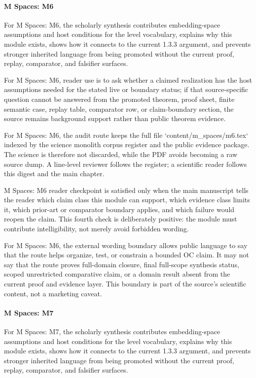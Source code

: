 \paragraph{M Spaces: M6}

For M Spaces: M6, the scholarly synthesis contributes embedding-space assumptions and host conditions for the level vocabulary, explains why this module exists, shows how it connects to the current 1.3.3 argument, and prevents stronger inherited language from being promoted without the current proof, replay, comparator, and falsifier surfaces.


For M Spaces: M6, reader use is to ask whether a claimed realization has the host assumptions needed for the stated live or boundary status; if that source-specific question cannot be answered from the promoted theorem, proof sheet, finite semantic case, replay table, comparator row, or claim-boundary section, the source remains background support rather than public theorem evidence.


For M Spaces: M6, the audit route keeps the full file `content/m\_spaces/m6.tex` indexed by the science monolith corpus register and the public evidence package. The science is therefore not discarded, while the PDF avoids becoming a raw source dump. A line-level reviewer follows the register; a scientific reader follows this digest and the main chapter.


M Spaces: M6 reader checkpoint is satisfied only when the main manuscript tells the reader which claim class this module can support, which evidence class limits it, which prior-art or comparator boundary applies, and which failure would reopen the claim. This fourth check is deliberately positive: the module must contribute intelligibility, not merely avoid forbidden wording.


For M Spaces: M6, the external wording boundary allows public language to say that the route helps organize, test, or constrain a bounded OC claim. It may not say that the route proves full-domain closure, final full-scope synthesis status, scoped unrestricted comparative claim, or a domain result absent from the current proof and evidence layer. This boundary is part of the source's scientific content, not a marketing caveat.


\paragraph{M Spaces: M7}

For M Spaces: M7, the scholarly synthesis contributes embedding-space assumptions and host conditions for the level vocabulary, explains why this module exists, shows how it connects to the current 1.3.3 argument, and prevents stronger inherited language from being promoted without the current proof, replay, comparator, and falsifier surfaces.


